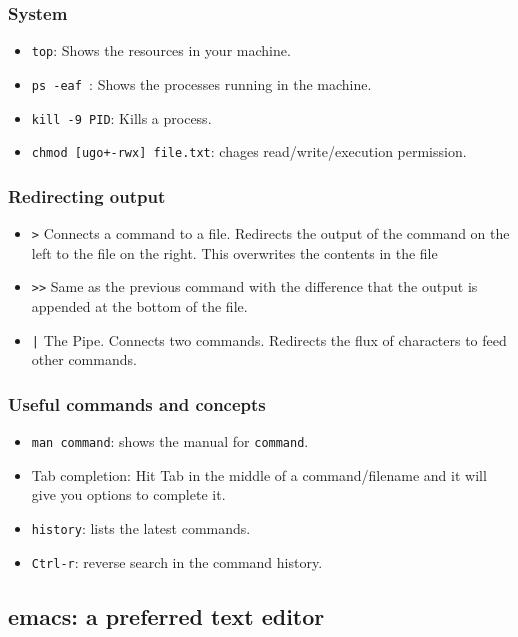 \documentclass{article}
\begin{document}
\subsubsection*{System}
\begin{itemize}
\item\verb"top": Shows the resources in your machine. 
\item\verb"ps -eaf ": Shows the processes running in the machine.
\item\verb"kill -9 PID": Kills a process.
\item\verb"chmod [ugo+-rwx] file.txt": chages read/write/execution permission.
\end{itemize}



\subsubsection*{Redirecting output}
\begin{itemize}
\item\verb">" Connects a command to a file. Redirects the output of the command on the left to the file on the right. This overwrites the contents in the file 
\item\verb">>" Same as the previous command with the difference that the output is appended at the bottom of the file.
\item\verb"|" The Pipe. Connects two commands. Redirects the flux of characters to feed other commands.
\end{itemize}

\subsubsection*{Useful commands and concepts}
\begin{itemize}
\item\verb"man command": shows the manual for \verb"command".
\item Tab completion: Hit Tab in the middle of a command/filename and it will give you options to complete it.
\item\verb"history": lists the latest commands.
\item\verb"Ctrl-r": reverse search in the command history.
\end{itemize}

\subsection{emacs: a preferred text editor}
\end{document}

